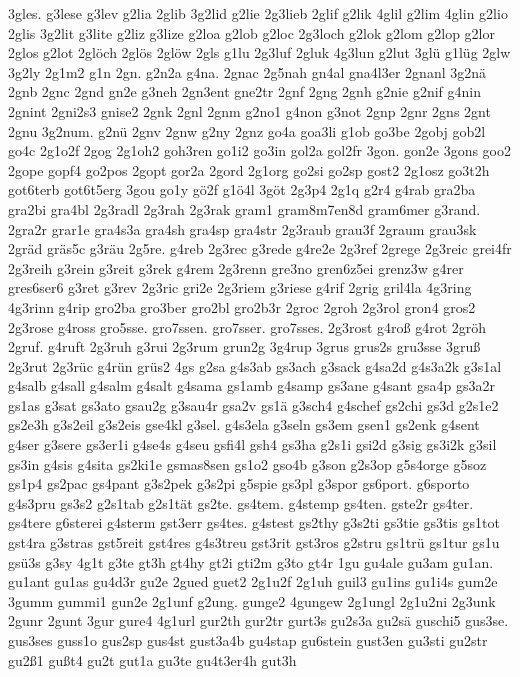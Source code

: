 {3gles.
g3lese
g3lev
g2lia
2glib
3g2lid
g2lie
2g3lieb
2glif
g2lik
4glil
g2lim
4glin
g2lio
2glis
3g2lit
g3lite
g2liz
g3lize
g2loa
g2lob
g2loc
2g3loch
g2lok
g2lom
g2lop
g2lor
2glos
g2lot
2glöch
2glös
2glöw
2gls
g1lu
2g3luf
2gluk
4g3lun
g2lut
3glü
g1lüg
2glw
3g2ly
2g1m2
g1n
2gn.
g2n2a
g4na.
2gnac
2g5nah
gn4al
gna4l3er
2gnanl
3g2nä
2gnb
2gnc
2gnd
gn2e
g3neh
2gn3ent
gne2tr
2gnf
2gng
2gnh
g2nie
g2nif
g4nin
2gnint
2gni2s3
gnise2
2gnk
2gnl
2gnm
g2no1
g4non
g3not
2gnp
2gnr
2gns
2gnt
2gnu
3g2num.
g2nü
2gnv
2gnw
g2ny
2gnz
go4a
goa3li
g1ob
go3be
2gobj
gob2l
go4c
2g1o2f
2gog
2g1oh2
goh3ren
go1i2
go3in
gol2a
gol2fr
3gon.
gon2e
3gons
goo2
2gope
gopf4
go2pos
2gopt
gor2a
2gord
2g1org
go2si
go2sp
gost2
2g1osz
go3t2h
got6terb
got6t5erg
3gou
go1y
gö2f
g1ö4l
3göt
2g3p4
2g1q
g2r4
g4rab
gra2ba
gra2bi
gra4bl
2g3radl
2g3rah
2g3rak
gram1
gram8m7en8d
gram6mer
g3rand.
2gra2r
grar1e
gra4s3a
gra4sh
gra4sp
gra4str
2g3raub
grau3f
2graum
grau3sk
2gräd
gräs5c
g3räu
2g5re.
g4reb
2g3rec
g3rede
g4re2e
2g3ref
2grege
2g3reic
grei4fr
2g3reih
g3rein
g3reit
g3rek
g4rem
2g3renn
gre3no
gren6z5ei
grenz3w
g4rer
gres6ser6
g3ret
g3rev
2g3ric
gri2e
2g3riem
g3riese
g4rif
2grig
gril4la
4g3ring
4g3rinn
g4rip
gro2ba
gro3ber
gro2bl
gro2b3r
2groc
2groh
2g3rol
gron4
gros2
2g3rose
g4ross
gro5sse.
gro7ssen.
gro7sser.
gro7sses.
2g3rost
g4roß
g4rot
2gröh
2gruf.
g4ruft
2g3ruh
g3rui
2g3rum
grun2g
3g4rup
3grus
grus2s
gru3sse
3gruß
2g3rut
2g3rüc
g4rün
grüs2
4gs
g2sa
g4s3ab
gs3ach
g3sack
g4sa2d
g4s3a2k
g3s1al
g4salb
g4sall
g4salm
g4salt
g4sama
gs1amb
g4samp
gs3ane
g4sant
gsa4p
gs3a2r
gs1as
g3sat
gs3ato
gsau2g
g3sau4r
gsa2v
gs1ä
g3sch4
g4schef
gs2chi
gs3d
g2s1e2
gs2e3h
g3s2eil
g3s2eis
gse4kl
g3sel.
g4s3ela
g3seln
gs3em
gsen1
gs2enk
g4sent
g4ser
g3sere
gs3er1i
g4se4s
g4seu
gsfi4l
gsh4
gs3ha
g2s1i
gsi2d
g3sig
gs3i2k
g3sil
gs3in
g4sis
g4sita
gs2ki1e
gsmas8sen
gs1o2
gso4b
g3son
g2s3op
g5s4orge
g5soz
gs1p4
gs2pac
gs4pant
g3s2pek
g3s2pi
g5spie
gs3pl
g3spor
gs6port.
g6sporto
g4s3pru
gs3s2
g2s1tab
g2s1tät
gs2te.
gs4tem.
g4stemp
gs4ten.
gste2r
gs4ter.
gs4tere
g6sterei
g4sterm
gst3err
gs4tes.
g4stest
gs2thy
g3s2ti
gs3tie
gs3tis
gs1tot
gst4ra
g3stras
gst5reit
gst4res
g4s3treu
gst3rit
gst3ros
g2stru
gs1trü
gs1tur
gs1u
gsü3s
g3sy
4g1t
g3te
gt3h
gt4hy
gt2i
gti2m
g3to
gt4r
1gu
gu4ale
gu3am
gu1an.
gu1ant
gu1as
gu4d3r
gu2e
2gued
guet2
2g1u2f
2g1uh
guil3
gu1ins
gu1i4s
gum2e
3gumm
gummi1
gun2e
2g1unf
g2ung.
gunge2
4gungew
2g1ungl
2g1u2ni
2g3unk
2gunr
2gunt
3gur
gure4
4g1url
gur2th
gur2tr
gurt3s
gu2s3a
gu2sä
guschi5
gus3se.
gus3ses
guss1o
gus2sp
gus4st
gust3a4b
gu4stap
gu6stein
gust3en
gu3sti
gu2str
gu2ß1
gußt4
gu2t
gut1a
gu3te
gu4t3er4h
gut3h
}
